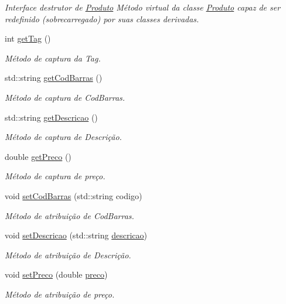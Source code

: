 \begin{DoxyCompactItemize}
\begin{DoxyCompactList}\small\item\em Interface destrutor de \hyperlink{classProduto}{Produto}  Método virtual da classe \hyperlink{classProduto}{Produto} capaz de ser redefinido (sobrecarregado) por suas classes derivadas. \end{DoxyCompactList}\item 
int \hyperlink{classProduto_a60c26b830a7fd5409a7b4e5a3abcecce}{get\-Tag} ()
\begin{DoxyCompactList}\small\item\em Método de captura da Tag. \end{DoxyCompactList}\item 
std\-::string \hyperlink{classProduto_aa8e9057d5f0ac3d145333223cb513b3e}{get\-Cod\-Barras} ()
\begin{DoxyCompactList}\small\item\em Método de captura de Cod\-Barras. \end{DoxyCompactList}\item 
std\-::string \hyperlink{classProduto_ada2c72e139e09afa967aa06a4290d5f8}{get\-Descricao} ()
\begin{DoxyCompactList}\small\item\em Método de captura de Descrição. \end{DoxyCompactList}\item 
double \hyperlink{classProduto_a53548783d7fad3ea6d5e000fa2227dcf}{get\-Preco} ()
\begin{DoxyCompactList}\small\item\em Método de captura de preço. \end{DoxyCompactList}\item 
void \hyperlink{classProduto_adec0c5a9864579405d522f0d405396d9}{set\-Cod\-Barras} (std\-::string codigo)
\begin{DoxyCompactList}\small\item\em Método de atribuição de Cod\-Barras. \end{DoxyCompactList}\item 
void \hyperlink{classProduto_afdc63d61e7948b1ae4b72b29d1115571}{set\-Descricao} (std\-::string \hyperlink{classProduto_ab04a024e24feb7f79774e280356f6bc7}{descricao})
\begin{DoxyCompactList}\small\item\em Método de atribuição de Descrição. \end{DoxyCompactList}\item 
void \hyperlink{classProduto_aba1d39de900f61e612219a42781f7f7e}{set\-Preco} (double \hyperlink{classProduto_a2ad13f91582fd70e878fc449c7b77171}{preco})
\begin{DoxyCompactList}\small\item\em Método de atribuição de preço. \end{DoxyCompactList}\end{DoxyCompactItemize}
